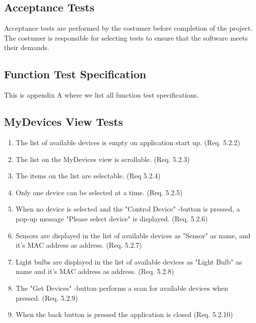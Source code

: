 \documentclass[a4paper]{article}
\newlength{\testlabellength}
\newenvironment{testlist}{\begin{enumerate}[label=\bfseries Test \thesubsection.\arabic* , labelindent=0pt, labelwidth=\testlabellength , leftmargin=2cm]}{\end{enumerate}}
\begin{document}
\subsection{Acceptance Tests}
Acceptance tests are performed by the costumer before completion of the project. The costumer is responsible for selecting tests to ensure that the software meets their demands.

\newpage
\begin{appendices}

\section{Function Test Specification} \label{appendix:section:functiontest}
This is appendix A where we list all function test specifications.

\subsection{MyDevices View Tests}
\begin{testlist}
	\item The list of available devices is empty on application start up. (Req. 5.2.2)
    \item The list on the MyDevices view is scrollable. (Req. 5.2.3)
   
    \item The items on the list are selectable. (Req 5.2.4)
    \item Only one device can be selected at a time. (Req. 5.2.5)
    \item When no device is selected and the "Control Device" -button is pressed, a pop-up message "Please select device" is displayed. (Req. 5.2.6)
    \item Sensors are displayed in the list of available devices as "Sensor" as name, and it's MAC address as address. (Req. 5.2.7)
    \item Light bulbs are displayed in the list of available devices as "Light Bulb" as name and it's MAC address as address. (Req. 5.2.8)
    \item The "Get Devices" -button performs a scan for available devices when pressed. (Req. 5.2.9)
    \item When the back button is pressed the application is closed (Req. 5.2.10)
\end{testlist}


\end{appendices}
\end{document}

